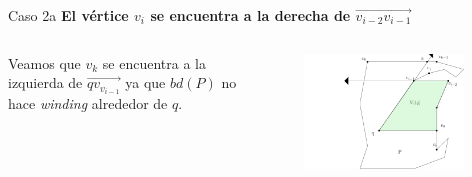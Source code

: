 \documentclass[aspectratio=169,xcolor=dvipsnames, t]{beamer}
\begin{document}
\begin{frame}{Caso 2a}
    \textbf{El vértice $v_{i}$ se encuentra a la derecha de $\overrightarrow{v_{i-2}v_{i-1}}$}\\
    \vspace{0.5cm}
    \begin{columns}
    \begin{column}{0.45\textwidth}
        Veamos que $v_{k}$ se encuentra a la izquierda de $\overrightarrow{qv_{v_{i-1}}}$ ya que $bd(P)$ no hace \textit{winding} alrededor de $q$. %
    \end{column}
    \begin{column}{0.45\textwidth}  %
    \vspace{-1.5cm} %
        \begin{figure}
            \centering
            \includegraphics[width=0.95\textwidth]{imagenes/Caso2.4b.png}
        \end{figure}
    \end{column}
    \end{columns}
\end{frame}

\end{document}
